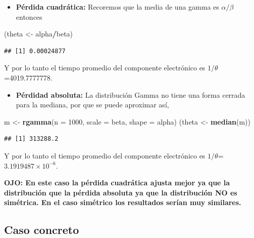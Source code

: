 \documentclass[
  12pt,
]{book}
\newenvironment{Shaded}{\begin{snugshade}}{\end{snugshade}}
\newcommand{\DataTypeTok}[1]{\textcolor[rgb]{0.13,0.29,0.53}{#1}}
\newcommand{\DecValTok}[1]{\textcolor[rgb]{0.00,0.00,0.81}{#1}}
\newcommand{\KeywordTok}[1]{\textcolor[rgb]{0.13,0.29,0.53}{\textbf{#1}}}
\newcommand{\NormalTok}[1]{#1}
\newcommand{\OperatorTok}[1]{\textcolor[rgb]{0.81,0.36,0.00}{\textbf{#1}}}
\newcommand{\StringTok}[1]{\textcolor[rgb]{0.31,0.60,0.02}{#1}}
\providecommand{\tightlist}{%
  \setlength{\itemsep}{0pt}\setlength{\parskip}{0pt}}
\begin{document}
\begin{itemize}
\tightlist
\item
  \textbf{Pérdida cuadrática:} Recoremos que la media de una gamma es \(\alpha/\beta\) entonces
\end{itemize}

\begin{Shaded}
\begin{Highlighting}[]
\NormalTok{(theta \textless{}{-}}\StringTok{ }\NormalTok{alpha}\OperatorTok{/}\NormalTok{beta)}
\end{Highlighting}
\end{Shaded}

\begin{verbatim}
## [1] 0.00024877
\end{verbatim}

Y por lo tanto el tiempo promedio del componente electrónico es \(1/\theta\)=4019.7777778.

\begin{itemize}
\tightlist
\item
  \textbf{Pérdidad absoluta:} La distribución Gamma no tiene una forma cerrada para la mediana, por que se puede aproximar así,
\end{itemize}

\begin{Shaded}
\begin{Highlighting}[]
\NormalTok{m \textless{}{-}}\StringTok{ }\KeywordTok{rgamma}\NormalTok{(}\DataTypeTok{n =} \DecValTok{1000}\NormalTok{, }\DataTypeTok{scale =}\NormalTok{ beta, }\DataTypeTok{shape =}\NormalTok{ alpha)}
\NormalTok{(theta \textless{}{-}}\StringTok{ }\KeywordTok{median}\NormalTok{(m))}
\end{Highlighting}
\end{Shaded}

\begin{verbatim}
## [1] 313288.2
\end{verbatim}

Y por lo tanto el tiempo promedio del componente electrónico es \(1/\theta\)=\ensuremath{3.1919487\times 10^{-6}}.

\textbf{OJO: En este caso la pérdida cuadrática ajusta mejor ya que la distribución que la pérdida absoluta ya que la distribución NO es simétrica. En el caso simétrico los resultados serían muy similares.}

\hypertarget{caso-concreto}{%
\subsection{Caso concreto}\label{caso-concreto}}
\end{document}
